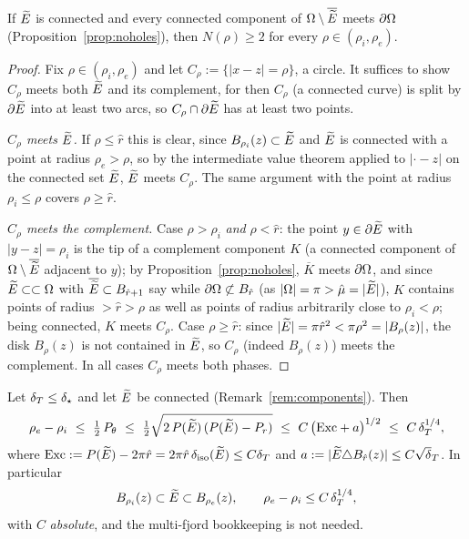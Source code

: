 \begin{lemma}\label{lem:Ncross}
If $\widetilde E$ is connected and every connected component of
$\Omega\setminus\overline{\widetilde E}$ meets $\partial\Omega$
\textup{(}Proposition~\ref{prop:noholes}\textup{)}, then $N(\rho)\ge2$ for
every $\rho\in(\rho_i,\rho_e)$.
\end{lemma}

\begin{proof}
Fix $\rho\in(\rho_i,\rho_e)$ and let $C_\rho:=\{|x-z|=\rho\}$, a circle. It
suffices to show $C_\rho$ meets both $\widetilde E$ and its complement, for then
$C_\rho$ (a connected curve) is split by $\partial\widetilde E$ into at least two
arcs, so $C_\rho\cap\partial\widetilde E$ has at least two points.

\emph{$C_\rho$ meets $\widetilde E$.} If $\rho\le\hat r$ this is clear, since
$B_{\rho_i}(z)\subset\widetilde E$ and $\widetilde E$ is connected with a point at radius
$\rho_e>\rho$, so by the intermediate value theorem applied to $|\cdot-z|$
on the connected set $\widetilde E$, $\widetilde E$ meets $C_\rho$. The same argument with
the point at radius $\rho_i\le\rho$ covers $\rho\ge\hat r$.

\emph{$C_\rho$ meets the complement.} Case $\rho>\rho_i$ \emph{and}
$\rho<\hat r$: the point $y\in\partial\widetilde E$ with $|y-z|=\rho_i$ is the tip
of a complement component $K$ (a connected component of
$\Omega\setminus\overline{\widetilde E}$ adjacent to $y$); by
Proposition~\ref{prop:noholes}, $\overline K$ meets $\partial\Omega$, and since
$\widetilde E\subset\subset\Omega$ with $\overline{\widetilde E}\subset B_{\hat r+1}$ say while
$\partial\Omega\not\subset B_{\hat r}$ (as $|\Omega|=\pi>\hat\mu=|\widetilde E|$), $K$
contains points of radius $>\hat r>\rho$ as well as points of radius
arbitrarily close to $\rho_i<\rho$; being connected, $K$ meets $C_\rho$.
Case $\rho\ge\hat r$: since $|\widetilde E|=\pi\hat r^2<\pi\rho^2=|B_\rho(z)|$, the
disk $B_\rho(z)$ is not contained in $\widetilde E$, so $C_\rho$ (indeed
$B_\rho(z)$) meets the complement. In all cases $C_\rho$ meets both phases.
\end{proof}

\begin{theorem}
\label{thm:perim-annulus}
Let $\delta_T\le\delta_\star$ and let $\widetilde E$ be connected
\textup{(}Remark~\ref{rem:components}\textup{)}. Then
\begin{equation}\label{eq:perim-annulus}
   \rho_e-\rho_i\ \le\ \tfrac12\,P_\theta\
   \le\ \tfrac12\sqrt{2\,P(\widetilde E)\,(P(\widetilde E)-P_r)}\
   \le\ C\,\bigl(\mathrm{Exc}+a\bigr)^{1/2}\ \le\ C\,\delta_T^{1/4},
\end{equation}
where $\mathrm{Exc}:=P(\widetilde E)-2\pi\hat r=2\pi\hat r\,\delta_{\mathrm{iso}}(\widetilde E)\le C\delta_T$
and $a:=|\Etil\triangle B_{\hat r}(z)|\le C\sqrt\dT$. In particular
\[
   B_{\rho_i}(z)\subset\widetilde E\subset B_{\rho_e}(z),
   \qquad \rho_e-\rho_i\le C\,\delta_T^{1/4},
\]
with $C$ \emph{absolute}, and the multi-fjord bookkeeping is not needed.
\end{theorem}

